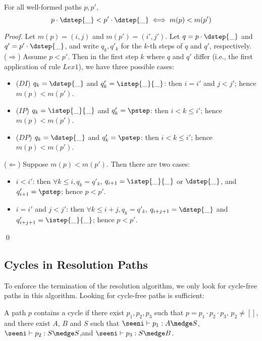 \begin{lemma}\label{lem:pathmescomp} 
For all well-formed paths $p,p'$,
\begin{equation*}
 p\cdot\dstep{\_} < p'\cdot\dstep{\_} \iff m(p) < m(p')  
\end{equation*}
\end{lemma}
\begin{proof} Let $m(p) = (i,j)$ and $m(p') = (i',j')$. Let
$q = p\cdot\dstep{\_}$ and $q' = p'\cdot\dstep{\_}$,
and write $q_k,q'_{k}$ for the $k$-th steps of $q$ and $q'$, respectively.
\\ ($\Longrightarrow$) Assume $p < p'$.
Then in the first step $k$ where $q$ and $q'$ differ (i.e., the first application of rule $Lex1$),
we have three possible cases:
\begin{itemize}
 \item ($DI$) $q_k = \dstep{\_}$ and $q'_k = \istep{\_}{\_}$: then $i = i'$ and $j < j'$; hence $m(p) < m(p')$.
 \item ($IP$) $q_k = \istep{\_}{\_}$ and $q'_k = \pstep$: then $i < k \le i'$; hence $m(p) < m(p')$.
 \item ($DP$) $q_k = \dstep{\_}$ and $q'_k = \pstep$: then $i < k \le i'$; hence $m(p) < m(p')$. 
\end{itemize}
($\Longleftarrow$) Suppose $m(p) < m(p')$. Then there are two cases:
\begin{itemize}
 \item $i < i'$: then $\forall k \leq i, q_k = q'_k$,  
                    $q_{i+1} = \istep{\_}{\_}$ or $\dstep{\_}$, and $q'_{i+1} = \pstep$; hence $p < p'$.
 \item $i = i'$ and $j < j'$: then  $\forall k \leq i+j, q_k = q'_k$,
                    $q_{i+j+1} = \dstep{\_}$ and $q'_{i+j+1} = \istep{\_}{\_}$; hence $p < p'$.
\end{itemize}
 \qed
\end{proof}


\subsection{Cycles in Resolution Paths}

To enforce the termination of the resolution algorithm, we only look for cycle-free paths in this algorithm.
Looking for cycle-free paths is sufficient:

\begin{definition}[Cycle] 
\label{def:cycle}
A path $p$ contains a cycle if there exist $p_1, p_2, p_3$ 
such that $p = p_1 \cdot p_2 \cdot p_3$, $p_2 \neq []$, and 
there exist $A$, $B$ and $S$ such that 
$\seeni \vdash p_1 : A \medge S$, $\seeni \vdash p_2 : S \medge S$,and
$\seeni \vdash p_3: S \medge B$.
\end{definition}


